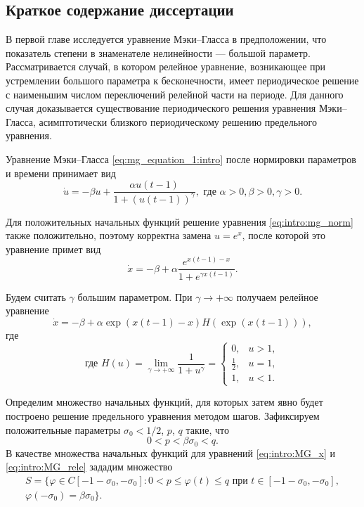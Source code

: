 \bigskip

\subsection*{Краткое содержание диссертации}

В первой главе исследуется уравнение Мэки--Гласса в предположении, что показатель степени в знаменателе нелинейности --- большой параметр. Рассматривается случай, в котором релейное уравнение, возникающее при устремлении большого параметра к бесконечности, имеет периодическое решение с наименьшим числом переключений релейной части на периоде. Для данного случая доказывается существование периодического решения уравнения Мэки--Гласса, асимптотически близкого периодическому решению предельного уравнения.

Уравнение Мэки--Гласса \eqref{eq:mg_equation_1:intro} после нормировки параметров и времени принимает вид
\begin{equation}
	\label{eq:intro:mg_norm}
	\dot{u}=-\beta u+\frac{\alpha u(t-1)}{1+(u(t-1))^\gamma}, \text{ где } \alpha > 0, \beta > 0, \gamma > 0.
\end{equation}

Для положительных начальных функций решение уравнения \eqref{eq:intro:mg_norm} также положительно, поэтому корректна замена $u = e^x$, после которой это уравнение примет вид
\begin{equation}
	\label{eq:intro:MG_x}
	\dot{x}=-\beta+\alpha\frac{e^{x(t-1)-x}}{1+e^{\gamma x(t-1)}}.
\end{equation}

Будем считать $\gamma$ большим параметром. При $\gamma \to +\infty$ получаем релейное уравнение
\begin{equation}
	\label{eq:intro:MG_rele}
	\dot{x}=-\beta + \alpha \exp({x(t-1)-x})H(\exp({x(t-1)})),
\end{equation}
где
\begin{equation}
	\label{eq:intro:H}
	\text{где }
	H(u)=\lim\limits_{\gamma\to +\infty}\frac{1}{1+u^{\gamma}}=
	\begin{cases}
		0, & u > 1,\\
		\frac{1}{2}, & u = 1,\\
		1, & u < 1.
	\end{cases}
\end{equation}

Определим множество начальных функций, для которых затем явно будет построено решение предельного уравнения методом шагов. Зафиксируем положительные параметры $\sigma_0 < 1/2$, $p$, $q$ такие, что 
%
\[0 < p < \beta \sigma_0 < q.\]
%
В качестве множества начальных функций для уравнений \eqref{eq:intro:MG_x} и \eqref{eq:intro:MG_rele} зададим множество
\begin{multline}
	\label{eq:intro:init_set}
	S=\{\varphi\in C[-1 - \sigma_0, -\sigma_0]: 0 < p \leqslant \varphi(t)\leqslant q \text{ при } t \in [-1 - \sigma_0, -\sigma_0],\\ \varphi(-\sigma_0) = \beta \sigma_0 \}.
\end{multline}

